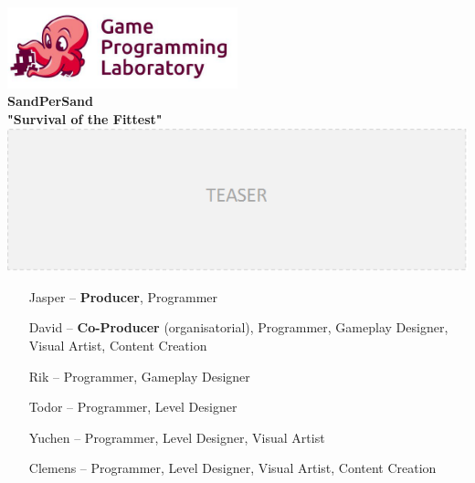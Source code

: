 \documentclass[a4paper,twoside,12pt,chapterprefix=false]{scrbook}
\begin{document}
\begin{titlepage}
	\oddsidemargin 0.0cm
	\evensidemargin 0.0cm
	
	\raggedleft \includegraphics*[width=0.5\textwidth]{figures/gpl_logo} \\
	
	\centering
	\Huge
	\vspace{2.0cm}
	\textbf{\textsf{SandPerSand}} \\[1.0cm]
	\large
	\textbf{\textsf{"Survival of the Fittest"}} \\[1.0cm]
	\includegraphics*[width=1.0\textwidth]{figures/teaser_temp} \\ [2.0cm]
	
	\sffamily
	\raggedright
	\vfill
	
	\large
	
	
	\begin{itemize}
	    \item[Jasper --]
	     \textbf{Producer}, Programmer \\
	    \item[David --]
	     \textbf{Co-Producer} (organisatorial), Programmer, Gameplay Designer, Visual Artist, Content Creation
	     \item[Rik --] 
	     Programmer, Gameplay Designer 
	     \item[Todor --]
	     Programmer, Level Designer 
	     \item[Yuchen --]
	     Programmer, Level Designer, Visual Artist
	     \item[Clemens --]
	     Programmer, Level Designer, Visual Artist, Content Creation
	\end{itemize}
	
\end{titlepage}
\clearemptydoublepage
\end{document}
